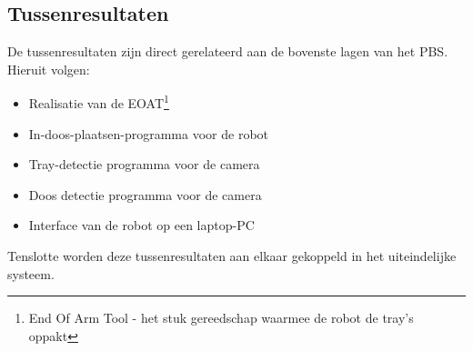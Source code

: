 \begin{tussenresultaten}
	\section{Tussenresultaten}
	De tussenresultaten zijn direct gerelateerd aan de bovenste lagen van het PBS.  
	\newline
	\newline
	Hieruit volgen:
	\begin{itemize}
	    \item Realisatie van de EOAT\footnote{End Of Arm Tool - het stuk gereedschap waarmee de robot de tray's oppakt}
	    \item In-doos-plaatsen-programma voor de robot
	    \item Tray-detectie programma voor de camera
	    \item Doos detectie programma voor de camera
	    \item Interface van de robot op een laptop-PC
	\end{itemize}
	Tenslotte worden deze tussenresultaten aan elkaar gekoppeld in het uiteindelijke systeem.

\end{tussenresultaten}



